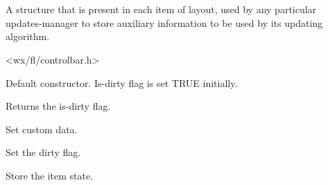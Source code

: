 %
%


\section{}\label{cbupdatemgrdata}


A structure that is present in each item of layout,
used by any particular updates-manager to store
auxiliary information to be used by its updating algorithm.




<wx/fl/controlbar.h>




\label{cbupdatemgrdatacbupdatemgrdata}


Default constructor. Is-dirty flag is set TRUE initially.


\label{cbupdatemgrdataisdirty}


Returns the is-dirty flag.


\label{cbupdatemgrdatasetcustomdata}


Set custom data.


\label{cbupdatemgrdatasetdirty}


Set the dirty flag.


\label{cbupdatemgrdatastoreitemstate}


Store the item state.

